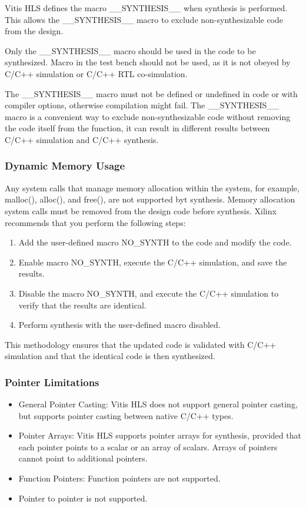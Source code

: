 \par Vitis HLS defines the macro \_\_SYNTHESIS\_\_ when synthesis is performed. This allows the \_\_SYNTHESIS\_\_ macro to exclude non-synthesizable code from the design.

\begin{highlight}
  Only the \_\_SYNTHESIS\_\_ macro should be used in the code to be synthesized. Macro in the test bench should not be used, as it is not obeyed by C/C++ simulation or C/C++ RTL co-simulation.
\end{highlight}

The \_\_SYNTHESIS\_\_ macro must not be defined or undefined in code or with compiler options, otherwise compilation might fail. The \_\_SYNTHESIS\_\_ macro is a convenient way to exclude non-synthesizable code without removing the code itself from the function, it can
result in different results between C/C++ simulation and C/C++ synthesis.

\subsubsection{Dynamic Memory Usage}
Any system calls that manage memory allocation within the system, for example, malloc(), alloc(), and free(), are not supported byt synthesis. Memory allocation system calls must be removed from the design code before synthesis. Xilinx recommends that you perform the following steps:

\begin{enumerate}[label=Step \arabic*:]
  \item Add the user-defined macro NO\_SYNTH to the code and modify the code.
  \item Enable macro NO\_SYNTH, execute the C/C++ simulation, and save the results.
  \item Disable the macro NO\_SYNTH, and execute the C/C++ simulation to verify that the results are identical.
  \item Perform synthesis with the user-defined macro disabled.
\end{enumerate}

This methodology ensures that the updated code is validated with C/C++ simulation and that the identical code is then synthesized.

\subsubsection{Pointer Limitations}
\begin{itemize}
  \item General Pointer Casting: Vitis HLS does not support general pointer casting, but supports pointer casting between native C/C++ types.
  \item Pointer Arrays: Vitis HLS supports pointer arrays for synthesis, provided that each pointer points to a scalar or an array of scalars. Arrays of pointers cannot point to additional pointers.
  \item Function Pointers: Function pointers are not supported.
  \item Pointer to pointer is not supported.
\end{itemize}

